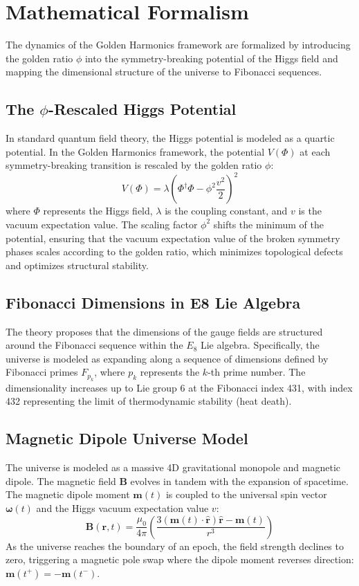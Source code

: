 \documentclass[11pt,twoside,a4paper]{article}
\begin{document}
\section{Mathematical Formalism}
The dynamics of the Golden Harmonics framework are formalized by introducing the golden ratio $\phi$ into the symmetry-breaking potential of the Higgs field and mapping the dimensional structure of the universe to Fibonacci sequences.

\subsection{The $\phi$-Rescaled Higgs Potential}
In standard quantum field theory, the Higgs potential is modeled as a quartic potential. In the Golden Harmonics framework, the potential $V(\Phi)$ at each symmetry-breaking transition is rescaled by the golden ratio $\phi$:
\begin{equation}
V(\Phi) = \lambda \left(\Phi^\dagger \Phi - \phi^2 \frac{v^2}{2}\right)^2
\end{equation}
where $\Phi$ represents the Higgs field, $\lambda$ is the coupling constant, and $v$ is the vacuum expectation value. The scaling factor $\phi^2$ shifts the minimum of the potential, ensuring that the vacuum expectation value of the broken symmetry phases scales according to the golden ratio, which minimizes topological defects and optimizes structural stability.

\subsection{Fibonacci Dimensions in E8 Lie Algebra}
The theory proposes that the dimensions of the gauge fields are structured around the Fibonacci sequence within the $E_8$ Lie algebra. Specifically, the universe is modeled as expanding along a sequence of dimensions defined by Fibonacci primes $F_{p_k}$, where $p_k$ represents the $k$-th prime number. The dimensionality increases up to Lie group 6 at the Fibonacci index 431, with index 432 representing the limit of thermodynamic stability (heat death).

\subsection{Magnetic Dipole Universe Model}
The universe is modeled as a massive 4D gravitational monopole and magnetic dipole. The magnetic field $\mathbf{B}$ evolves in tandem with the expansion of spacetime. The magnetic dipole moment $\mathbf{m}(t)$ is coupled to the universal spin vector $\boldsymbol{\omega}(t)$ and the Higgs vacuum expectation value $v$:
\begin{equation}
\mathbf{B}(\mathbf{r}, t) = \frac{\mu_0}{4\pi} \left( \frac{3(\mathbf{m}(t) \cdot \hat{\mathbf{r}})\hat{\mathbf{r}} - \mathbf{m}(t)}{r^3} \right)
\end{equation}
As the universe reaches the boundary of an epoch, the field strength declines to zero, triggering a magnetic pole swap where the dipole moment reverses direction: $\mathbf{m}(t^+) = -\mathbf{m}(t^-)$.
\end{document}
